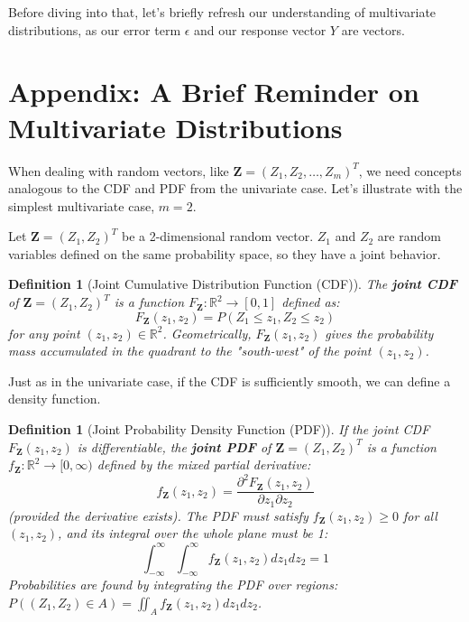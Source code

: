 \documentclass[11pt]{article}
\theoremstyle{mytheoremstyle}
\theoremstyle{mydefinitionstyle}
\newtheorem{definition}[theorem]{Definition}
\newcommand{\vect}[1]{\mathbf{#1}}
\begin{document}
Before diving into that, let's briefly refresh our understanding of multivariate distributions, as our error term $\epsilon$ and our response vector $Y$ are vectors.

\section{Appendix: A Brief Reminder on Multivariate Distributions}

When dealing with random vectors, like $\vect{Z} = (Z_1, Z_2, \dots, Z_m)^T$, we need concepts analogous to the CDF and PDF from the univariate case. Let's illustrate with the simplest multivariate case, $m=2$.

Let $\vect{Z} = (Z_1, Z_2)^T$ be a 2-dimensional random vector. $Z_1$ and $Z_2$ are random variables defined on the same probability space, so they have a joint behavior.

\begin{definition}[Joint Cumulative Distribution Function (CDF)]
The \textbf{joint CDF} of $\vect{Z} = (Z_1, Z_2)^T$ is a function $F_{\vect{Z}}: \mathbb{R}^2 \to [0, 1]$ defined as:
\begin{equation*}
F_{\vect{Z}}(z_1, z_2) = P(Z_1 \le z_1, Z_2 \le z_2)
\end{equation*}
for any point $(z_1, z_2) \in \mathbb{R}^2$. Geometrically, $F_{\vect{Z}}(z_1, z_2)$ gives the probability mass accumulated in the quadrant to the "south-west" of the point $(z_1, z_2)$.
\end{definition}

Just as in the univariate case, if the CDF is sufficiently smooth, we can define a density function.

\begin{definition}[Joint Probability Density Function (PDF)]
If the joint CDF $F_{\vect{Z}}(z_1, z_2)$ is differentiable, the \textbf{joint PDF} of $\vect{Z} = (Z_1, Z_2)^T$ is a function $f_{\vect{Z}}: \mathbb{R}^2 \to [0, \infty)$ defined by the mixed partial derivative:
\begin{equation*}
f_{\vect{Z}}(z_1, z_2) = \frac{\partial^2 F_{\vect{Z}}(z_1, z_2)}{\partial z_1 \partial z_2}
\end{equation*}
(provided the derivative exists). The PDF must satisfy $f_{\vect{Z}}(z_1, z_2) \ge 0$ for all $(z_1, z_2)$, and its integral over the whole plane must be 1:
\begin{equation*}
\int_{-\infty}^{\infty} \int_{-\infty}^{\infty} f_{\vect{Z}}(z_1, z_2) dz_1 dz_2 = 1
\end{equation*}
Probabilities are found by integrating the PDF over regions: $P((Z_1, Z_2) \in A) = \iint_A f_{\vect{Z}}(z_1, z_2) dz_1 dz_2$.
\end{definition}
\end{document}
